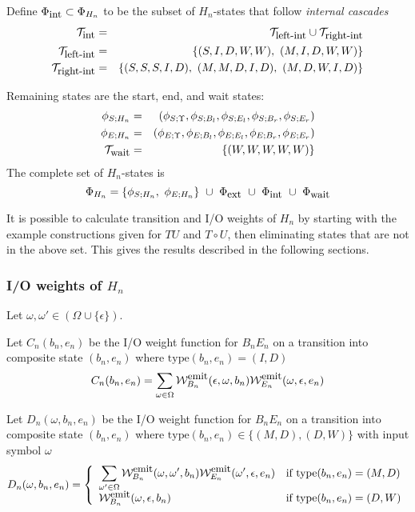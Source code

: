 \documentclass{article}
\newcommand\gappedalphabet[1]{(\Omega_{#1} \cup \{\epsilon\})}
\newcommand\compose{}
\newcommand\fork{\circ}
\newcommand\idfork{\Upsilon}
\newcommand\States{\Phi}
\newcommand\statesof[1]{\States_{#1}}
\newcommand\startstateof[1]{\phi_{S;#1}}
\newcommand\laststateof[1]{\phi_{E;#1}}
\newcommand\weight{{\cal W}}
\newcommand\weightfunof[1]{\weight_{#1}}
\newcommand\emitweightfun[1]{\weightfunof{#1}^{\mbox{\small emit}}}
\newcommand\statetype{\mbox{type}}
\newcommand\typeset[1]{{\cal T}_{\mbox{\small #1}}}
\newcommand\stateset[1]{\statesof{\mbox{\small #1}}}
\newcommand\externalsuffix{ext}
\newcommand\internalsuffix{int}
\newcommand\leftsuffix{left-int}
\newcommand\rightsuffix{right-int}
\newcommand\waitsuffix{wait}
\newcommand\externalcascades{\stateset{\externalsuffix}}
\newcommand\internalcascades{\stateset{\internalsuffix}}
\newcommand\waitstates{\stateset{\waitsuffix}}
\newcommand\internaltypes{\typeset{\internalsuffix}}
\newcommand\lefttypes{\typeset{\leftsuffix}}
\newcommand\righttypes{\typeset{\rightsuffix}}
\newcommand\waittypes{\typeset{\waitsuffix}}
\begin{document}
Define $\internalcascades \subset \statesof{H_n}$ to be the subset of $H_n$-states that follow {\em internal cascades}
\begin{eqnarray*}
\internaltypes & = & \lefttypes \cup \righttypes \\
\lefttypes & = & \{ (S,I,D,W,W),\ (M,I,D,W,W) \} \\
\righttypes & =  & \{ (S,S,S,I,D),\ (M,M,D,I,D),\ (M,D,W,I,D) \}
\end{eqnarray*}

Remaining states are the start, end, and wait states:
\begin{eqnarray*}
\startstateof{H_n} & = & (\startstateof{\idfork},\startstateof{B_l},\startstateof{E_l},\startstateof{B_r},\startstateof{E_r}) \\
\laststateof{H_n} & = & (\laststateof{\idfork},\laststateof{B_l},\laststateof{E_l},\laststateof{B_r},\laststateof{E_r}) \\
\waittypes & = & \{ (W,W,W,W,W) \}
\end{eqnarray*}
The complete set of $H_n$-states is
\[
\statesof{H_n} = \{ \startstateof{H_n},\ \laststateof{H_n} \}\ \cup\ \externalcascades\ \cup\ \internalcascades\ \cup\ \waitstates
\]

It is possible to calculate transition and I/O weights of $H_n$
by starting with the example constructions given for $T \compose U$ and $T \fork U$,
then eliminating states that are not in the above set.
This gives the results described in the following sections.

\subsubsection{I/O weights of $H_n$}

Let $\omega,\omega' \in \gappedalphabet{}$.

Let $C_n(b_n,e_n)$ be the I/O weight function for $B_n \compose E_n$ on a transition into composite state $(b_n,e_n)$ where $\statetype(b_n,e_n)=(I,D)$
\[
C_n(b_n,e_n) = \sum_{\omega \in \Omega} \emitweightfun{B_n}(\epsilon,\omega,b_n) \emitweightfun{E_n}(\omega,\epsilon,e_n)
\]

Let $D_n(\omega,b_n,e_n)$ be the I/O weight function for $B_n \compose E_n$ on a transition into composite state $(b_n,e_n)$
 where $\statetype(b_n,e_n) \in \{(M,D),(D,W)\}$ with input symbol $\omega$ 
\[
D_n(\omega,b_n,e_n) = \left\{
\begin{array}{ll}
\displaystyle
\sum_{\omega' \in \Omega} \emitweightfun{B_n}(\omega,\omega',b_n) \emitweightfun{E_n}(\omega',\epsilon,e_n)
 & \mbox{if $\statetype(b_n,e_n)=(M,D)$} \\
\emitweightfun{B_n}(\omega,\epsilon,b_n)
 & \mbox{if $\statetype(b_n,e_n)=(D,W)$}
\end{array}
\right.
\]
\end{document}
